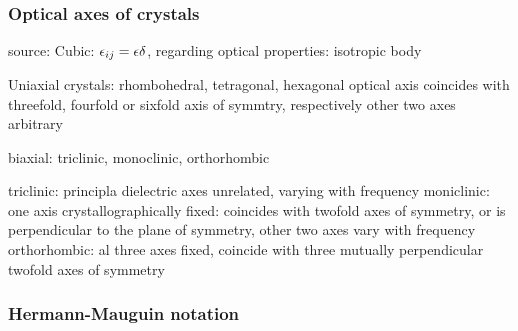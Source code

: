\subsubsection{Optical axes of crystals}
\label{sec:optical_axes}
source: \cite{landau1984electrodynamics}
Cubic: $\epsilon_{ij} = \epsilon \delta$, regarding optical properties: isotropic body

Uniaxial crystals: rhombohedral, tetragonal, hexagonal
optical  axis coincides with threefold, 
fourfold or sixfold axis of symmtry, respectively
other two axes arbitrary

biaxial: triclinic, monoclinic, orthorhombic

triclinic: principla dielectric axes unrelated, varying with frequency
moniclinic: one axis crystallographically fixed: coincides with twofold 
axes of symmetry, or is perpendicular to the plane of symmetry, 
other two axes vary with frequency
orthorhombic: al three axes fixed, coincide with three mutually 
perpendicular twofold axes of symmetry



\subsubsection{Hermann-Mauguin notation}

